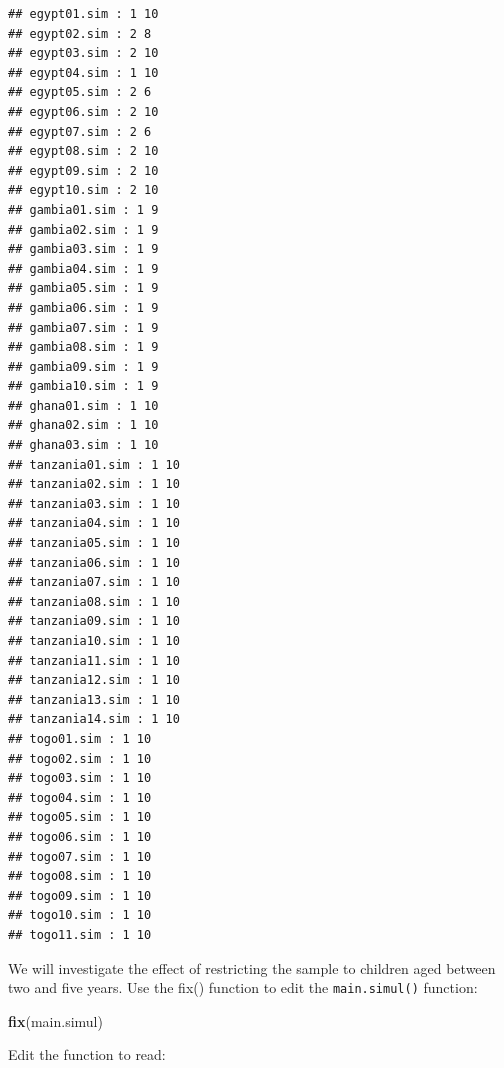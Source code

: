 \documentclass[12pt,a4paper]{book}
\newenvironment{Shaded}{\begin{snugshade}}{\end{snugshade}}
\newcommand{\KeywordTok}[1]{\textcolor[rgb]{0.13,0.29,0.53}{\textbf{#1}}}
\newcommand{\DataTypeTok}[1]{\textcolor[rgb]{0.13,0.29,0.53}{#1}}
\newcommand{\DecValTok}[1]{\textcolor[rgb]{0.00,0.00,0.81}{#1}}
\newcommand{\CharTok}[1]{\textcolor[rgb]{0.31,0.60,0.02}{#1}}
\newcommand{\StringTok}[1]{\textcolor[rgb]{0.31,0.60,0.02}{#1}}
\newcommand{\OtherTok}[1]{\textcolor[rgb]{0.56,0.35,0.01}{#1}}
\newcommand{\ControlFlowTok}[1]{\textcolor[rgb]{0.13,0.29,0.53}{\textbf{#1}}}
\newcommand{\OperatorTok}[1]{\textcolor[rgb]{0.81,0.36,0.00}{\textbf{#1}}}
\newcommand{\NormalTok}[1]{#1}
\theoremstyle{definition}
\theoremstyle{definition}
\theoremstyle{definition}
\theoremstyle{remark}
\begin{document}
\begin{verbatim}
## egypt01.sim : 1 10 
## egypt02.sim : 2 8 
## egypt03.sim : 2 10 
## egypt04.sim : 1 10 
## egypt05.sim : 2 6 
## egypt06.sim : 2 10 
## egypt07.sim : 2 6 
## egypt08.sim : 2 10 
## egypt09.sim : 2 10 
## egypt10.sim : 2 10 
## gambia01.sim : 1 9 
## gambia02.sim : 1 9 
## gambia03.sim : 1 9 
## gambia04.sim : 1 9 
## gambia05.sim : 1 9 
## gambia06.sim : 1 9 
## gambia07.sim : 1 9 
## gambia08.sim : 1 9 
## gambia09.sim : 1 9 
## gambia10.sim : 1 9 
## ghana01.sim : 1 10 
## ghana02.sim : 1 10 
## ghana03.sim : 1 10 
## tanzania01.sim : 1 10 
## tanzania02.sim : 1 10 
## tanzania03.sim : 1 10 
## tanzania04.sim : 1 10 
## tanzania05.sim : 1 10 
## tanzania06.sim : 1 10 
## tanzania07.sim : 1 10 
## tanzania08.sim : 1 10 
## tanzania09.sim : 1 10 
## tanzania10.sim : 1 10 
## tanzania11.sim : 1 10 
## tanzania12.sim : 1 10 
## tanzania13.sim : 1 10 
## tanzania14.sim : 1 10 
## togo01.sim : 1 10 
## togo02.sim : 1 10 
## togo03.sim : 1 10 
## togo04.sim : 1 10 
## togo05.sim : 1 10 
## togo06.sim : 1 10 
## togo07.sim : 1 10 
## togo08.sim : 1 10 
## togo09.sim : 1 10 
## togo10.sim : 1 10 
## togo11.sim : 1 10
\end{verbatim}

We will investigate the effect of restricting the sample to children
aged between two and five years. Use the fix() function to edit the
\texttt{main.simul()} function:

\begin{Shaded}
\begin{Highlighting}[]
\KeywordTok{fix}\NormalTok{(main.simul)}
\end{Highlighting}
\end{Shaded}

Edit the function to read:

\begin{Shaded}
\end{Shaded}
\end{document}
